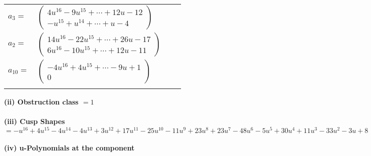 \documentclass[1p]{elsarticle_modified}
\theoremstyle{definition}
\begin{document}
\begin{tabular}{m{7pt} m{180pt} m{7pt} m{180pt} }
\flushright $a_{3}=$&$\begin{pmatrix}4 u^{16}-9 u^{15}+\cdots+12 u-12\\- u^{15}+u^{14}+\cdots+u-4\end{pmatrix}$ \\
\flushright $a_{2}=$&$\begin{pmatrix}14 u^{16}-22 u^{15}+\cdots+26 u-17\\6 u^{16}-10 u^{15}+\cdots+12 u-11\end{pmatrix}$ \\
\flushright $a_{10}=$&$\begin{pmatrix}-4 u^{16}+4 u^{15}+\cdots-9 u+1\\0\end{pmatrix}$\\&\end{tabular}
\flushleft \textbf{(ii) Obstruction class $= 1$}\\~\\
\flushleft \textbf{(iii) Cusp Shapes $= - u^{16}+4 u^{15}-4 u^{14}-4 u^{13}+3 u^{12}+17 u^{11}-25 u^{10}-11 u^9+23 u^8+23 u^7-48 u^6-5 u^5+30 u^4+11 u^3-33 u^2-3 u+8$}\\~\\
\newpage\renewcommand{\arraystretch}{1}
\flushleft \textbf{(iv) u-Polynomials at the component}\newline \\
\end{document}
